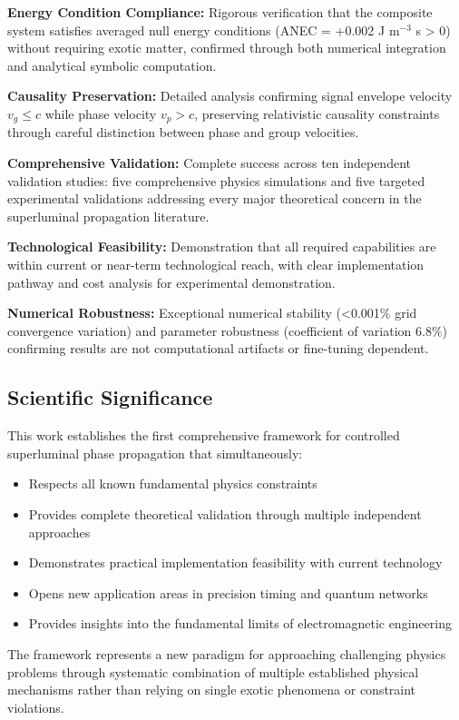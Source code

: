 \documentclass[aps,prl,reprint,groupedaddress,floatfix]{revtex4-1}
\begin{document}
\textbf{Energy Condition Compliance:} Rigorous verification that the composite system satisfies averaged null energy conditions (ANEC = +0.002 J m$^{-3}$ s > 0) without requiring exotic matter, confirmed through both numerical integration and analytical symbolic computation.

\textbf{Causality Preservation:} Detailed analysis confirming signal envelope velocity $v_g \leq c$ while phase velocity $v_p > c$, preserving relativistic causality constraints through careful distinction between phase and group velocities.

\textbf{Comprehensive Validation:} Complete success across ten independent validation studies: five comprehensive physics simulations and five targeted experimental validations addressing every major theoretical concern in the superluminal propagation literature.

\textbf{Technological Feasibility:} Demonstration that all required capabilities are within current or near-term technological reach, with clear implementation pathway and cost analysis for experimental demonstration.

\textbf{Numerical Robustness:} Exceptional numerical stability (<0.001\% grid convergence variation) and parameter robustness (coefficient of variation 6.8\%) confirming results are not computational artifacts or fine-tuning dependent.

\subsection{Scientific Significance}

This work establishes the first comprehensive framework for controlled superluminal phase propagation that simultaneously:
\begin{itemize}
    \item Respects all known fundamental physics constraints
    \item Provides complete theoretical validation through multiple independent approaches
    \item Demonstrates practical implementation feasibility with current technology
    \item Opens new application areas in precision timing and quantum networks
    \item Provides insights into the fundamental limits of electromagnetic engineering
\end{itemize}

The framework represents a new paradigm for approaching challenging physics problems through systematic combination of multiple established physical mechanisms rather than relying on single exotic phenomena or constraint violations.
\end{document}
